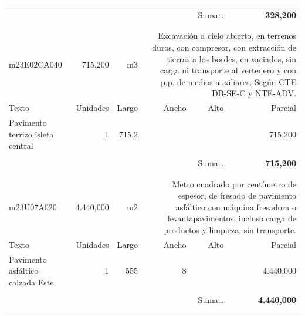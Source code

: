 \documentclass{book}%
\begin{document}
\begin{longtable}{lrrrrr}
&&&&&\\%
\multicolumn{5}{r}{Suma\ldots}&\textbf{   328,200}\\%
\hline%
&&&&&\\%
&&&&&\\%
m23E02CA040&   715,200& m3&\multicolumn{3}{p{6cm}}{\scriptsize Excavación a cielo abierto, en terrenos duros, con compresor, con extracción de tierras a los bordes, en vaciados, sin carga ni transporte al vertedero y con p.p. de medios auxiliares. Según CTE DB-SE-C y NTE-ADV.\normalsize}\\%
Texto&Unidades&Largo&Ancho&Alto&Parcial\\%
\hline%
\multicolumn{1}{p{3.5cm}}{Pavimento terrizo isleta central}&1&715,2&&&   715,200\\%
&&&&&\\%
\multicolumn{5}{r}{Suma\ldots}&\textbf{   715,200}\\%
\hline%
&&&&&\\%
&&&&&\\%
m23U07A020& 4.440,000& m2&\multicolumn{3}{p{6cm}}{\scriptsize Metro cuadrado por centímetro de espesor, de fresado de pavimento asfáltico con máquina fresadora o levantapavimentos, incluso carga de productos y limpieza, sin transporte.\normalsize}\\%
Texto&Unidades&Largo&Ancho&Alto&Parcial\\%
\hline%
\multicolumn{1}{p{3.5cm}}{Pavimento asfáltico calzada Este}&1&555&8&& 4.440,000\\%
&&&&&\\%
\multicolumn{5}{r}{Suma\ldots}&\textbf{ 4.440,000}\\%
\hline%
&&&&&\\%
\end{longtable}%
\newpage

%
\end{document}
